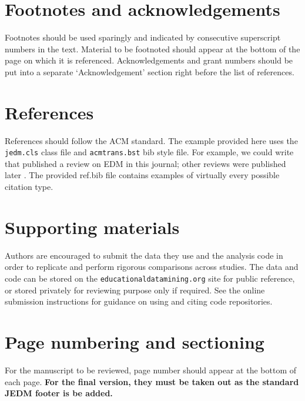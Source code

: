 \documentclass[notitlepage,12pt]{jedm}
\begin{document}
\section{Footnotes and acknowledgements}

Footnotes should be used sparingly and indicated by consecutive superscript numbers in the text. Material to be footnoted should appear at the bottom of the page on which it is referenced. Acknowledgements and grant numbers should be put into a separate `Acknowledgement' section right before the list of references.

\section{References}

References should follow the ACM standard.  The example provided here uses the \texttt{jedm.cls} class file and \texttt{acmtrans.bst} bib style file.  For example, we could write that  published a review on EDM in this journal; other reviews were published later \cite[for eg.]{romero2010educational}. The provided ref.bib file contains examples of virtually every possible citation type.


\section{Supporting materials}

Authors are encouraged to submit the data they use and the analysis code in order to replicate and perform rigorous comparisons across studies.  The data and code can be stored on the \texttt{educationaldatamining.org} site for public reference, or stored privately for reviewing purpose only if required. See the online submission instructions for guidance on using and citing code repositories.


\section{Page numbering and sectioning}

For the manuscript to be reviewed, page number should appear at the bottom of each page.  \textbf{For the final version, they must be taken out as the standard JEDM footer is be added.}
\end{document}
